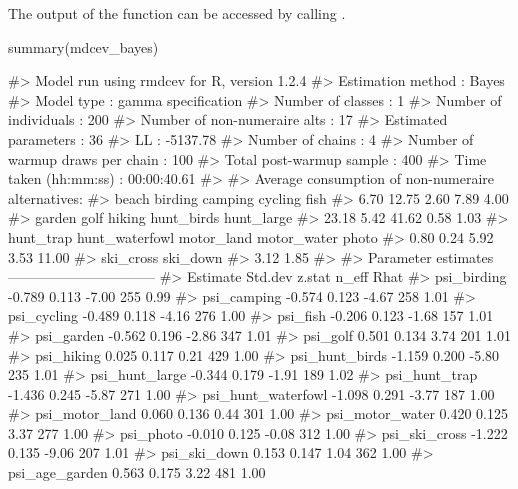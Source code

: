 The output of the function can be accessed by calling .

\begin{Schunk}
\begin{Sinput}
    summary(mdcev_bayes)
\end{Sinput}
\begin{Soutput}
#> Model run using rmdcev for R, version 1.2.4 
#> Estimation method                : Bayes
#> Model type                       : gamma specification
#> Number of classes                : 1
#> Number of individuals            : 200
#> Number of non-numeraire alts     : 17
#> Estimated parameters             : 36
#> LL                               : -5137.78
#> Number of chains                 : 4
#> Number of warmup draws per chain : 100
#> Total post-warmup sample         : 400
#> Time taken (hh:mm:ss)            : 00:00:40.61
#> 
#> Average consumption of non-numeraire alternatives:
#>          beach        birding        camping        cycling           fish 
#>           6.70          12.75           2.60           7.89           4.00 
#>         garden           golf         hiking     hunt_birds     hunt_large 
#>          23.18           5.42          41.62           0.58           1.03 
#>      hunt_trap hunt_waterfowl     motor_land    motor_water          photo 
#>           0.80           0.24           5.92           3.53          11.00 
#>      ski_cross       ski_down 
#>           3.12           1.85 
#> 
#> Parameter estimates --------------------------------  
#>                      Estimate Std.dev z.stat n_eff Rhat
#> psi_birding            -0.789   0.113  -7.00   255 0.99
#> psi_camping            -0.574   0.123  -4.67   258 1.01
#> psi_cycling            -0.489   0.118  -4.16   276 1.00
#> psi_fish               -0.206   0.123  -1.68   157 1.01
#> psi_garden             -0.562   0.196  -2.86   347 1.01
#> psi_golf                0.501   0.134   3.74   201 1.01
#> psi_hiking              0.025   0.117   0.21   429 1.00
#> psi_hunt_birds         -1.159   0.200  -5.80   235 1.01
#> psi_hunt_large         -0.344   0.179  -1.91   189 1.02
#> psi_hunt_trap          -1.436   0.245  -5.87   271 1.00
#> psi_hunt_waterfowl     -1.098   0.291  -3.77   187 1.00
#> psi_motor_land          0.060   0.136   0.44   301 1.00
#> psi_motor_water         0.420   0.125   3.37   277 1.00
#> psi_photo              -0.010   0.125  -0.08   312 1.00
#> psi_ski_cross          -1.222   0.135  -9.06   207 1.01
#> psi_ski_down            0.153   0.147   1.04   362 1.00
#> psi_age_garden          0.563   0.175   3.22   481 1.00

\end{Soutput}
\end{Schunk}
